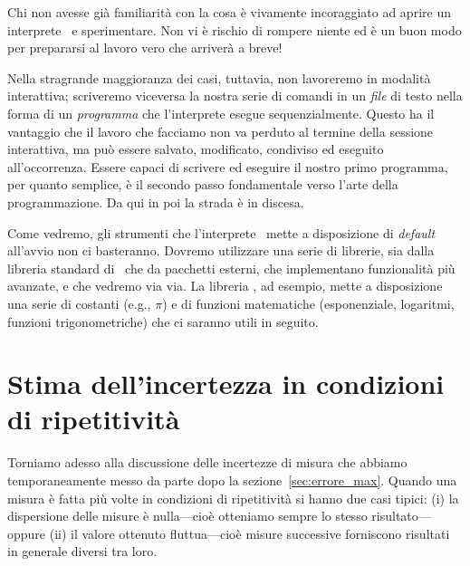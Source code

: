 Chi non avesse già familiarità con la cosa è vivamente incoraggiato ad
aprire un interprete \python\ e sperimentare. Non vi è rischio di rompere
niente ed è un buon modo per prepararsi al lavoro vero che arriverà a breve!

Nella stragrande maggioranza dei casi, tuttavia, non lavoreremo in modalità
interattiva; scriveremo viceversa la nostra serie di comandi in un \emph{file}
di testo nella forma di un \emph{programma} che l'interprete esegue
sequenzialmente. Questo ha il vantaggio che il lavoro che facciamo non va
perduto al termine della sessione interattiva, ma può essere salvato,
modificato, condiviso ed eseguito all'occorrenza. Essere capaci di scrivere ed
eseguire il nostro primo programma, per quanto semplice, è il secondo passo
fondamentale verso l'arte della programmazione. Da qui in poi la strada è in
discesa.

Come vedremo, gli strumenti che l'interprete \python\ mette a disposizione di
\emph{default} all'avvio non ci basteranno. Dovremo utilizzare una serie
di librerie, sia dalla libreria standard di \python\ che da pacchetti esterni,
che implementano funzionalità più avanzate, e che vedremo via via. La
libreria , ad esempio, mette a disposizione una serie di costanti
(e.g., $\pi$) e di funzioni matematiche (esponenziale, logaritmi, funzioni
trigonometriche) che ci saranno utili in seguito.

\begin{snippet}[htb!]
  \bigskip %
\end{snippet}


\section{Stima dell'incertezza in condizioni di ripetitività}
\label{sec:stima_errore_max}

Torniamo adesso alla discussione delle incertezze di misura che abbiamo
temporaneamente messo da parte dopo la sezione~\ref{sec:errore_max}.
Quando una misura è fatta più volte in condizioni di ripetitività si
hanno due casi tipici: (i) la dispersione delle misure è nulla---cioè
otteniamo sempre lo stesso risultato---oppure (ii) il valore ottenuto
fluttua---cioè misure successive forniscono risultati in generale diversi
tra loro.


